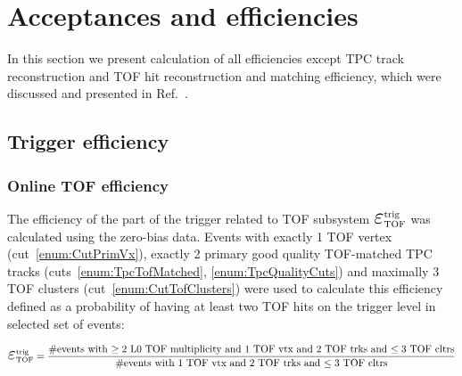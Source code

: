 \section{Acceptances and efficiencies}

In this section we present calculation of all efficiencies except TPC track reconstruction and TOF hit reconstruction and matching efficiency, which were discussed and presented in Ref.~\cite{supplementaryNote}.

\subsection{Trigger efficiency}\label{sec:triggerEff} 


\subsubsection{Online TOF efficiency}\label{sec:tofOnlineEff}
The efficiency of the part of the trigger related to TOF subsystem $\mbox{\LARGE$\varepsilon$}_{\text{TOF}}^{\text{trig}}$ was calculated using the zero-bias data. Events with exactly 1 TOF vertex (cut~\ref{enum:CutPrimVx}), exactly 2 primary good quality TOF-matched TPC tracks (cuts~\ref{enum:TpcTofMatched}, \ref{enum:TpcQualityCuts}) and maximally 3 TOF clusters (cut~\ref{enum:CutTofClusters}) were used to calculate this efficiency defined as a probability of having at least two TOF hits on the trigger level in selected set of events:

\begin{equation}
 \mbox{\LARGE$\varepsilon$}_{\text{TOF}}^{\text{trig}} = \frac{\text{\#events with $\geq2$ L0 TOF multiplicity and 1 TOF vtx and 2 TOF trks and $\leq3$ TOF cltrs}}{\text{\#events with 1 TOF vtx and 2 TOF trks and $\leq3$ TOF cltrs}}
\end{equation}

